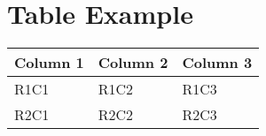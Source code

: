 \documentclass[weekly_log.tex]{subfiles}
\begin{document}
\hypertarget{table-example}{%
\section{Table Example}\label{table-example}}

\begin{longtable}[]{@{}lll@{}}
\toprule()
Column 1 & Column 2 & Column 3 \\
\midrule()
\endhead
R1C1 & R1C2 & R1C3 \\
R2C1 & R2C2 & R2C3 \\
\bottomrule()
\end{longtable}



\bib{}
\end{document}
